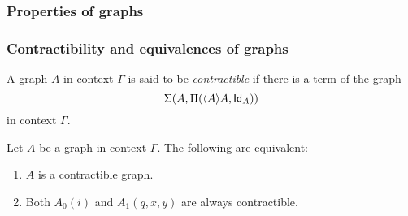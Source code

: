 \subsubsection{Properties of graphs}

\subsubsection{Contractibility and equivalences of graphs}

\begin{defn}
A graph $A$ in context $\Gamma$ is said to be \emph{contractible} if there
is a term of the graph
\begin{equation*}
\msm{A}{\mprd{\ctxwk{A}{A}}{\idtypevar{A}}}
\end{equation*}
in context $\Gamma$.
\end{defn}

\begin{lem}\label{lem:contractible-graphs}
Let $A$ be a graph in context $\Gamma$. The following are equivalent:
\begin{enumerate}
\item $A$ is a contractible graph.
\item Both $A_0(i)$ and $A_1(q,x,y)$ are always contractible.
\end{enumerate}
\end{lem}


